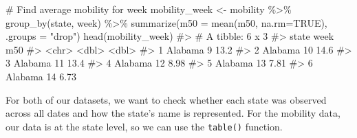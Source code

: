 \documentclass[
  letterpaper,
]{latex/krantz}
\makeatletter
\newenvironment{Shaded}{\begin{snugshade}}{\end{snugshade}}
\newcommand{\AttributeTok}[1]{\textcolor[rgb]{0.40,0.45,0.13}{#1}}
\newcommand{\CommentTok}[1]{\textcolor[rgb]{0.37,0.37,0.37}{#1}}
\newcommand{\ConstantTok}[1]{\textcolor[rgb]{0.56,0.35,0.01}{#1}}
\newcommand{\FunctionTok}[1]{\textcolor[rgb]{0.28,0.35,0.67}{#1}}
\newcommand{\NormalTok}[1]{\textcolor[rgb]{0.00,0.23,0.31}{#1}}
\newcommand{\OtherTok}[1]{\textcolor[rgb]{0.00,0.23,0.31}{#1}}
\newcommand{\SpecialCharTok}[1]{\textcolor[rgb]{0.37,0.37,0.37}{#1}}
\newcommand{\StringTok}[1]{\textcolor[rgb]{0.13,0.47,0.30}{#1}}
\newenvironment{kframe}{%
\medskip{}
\setlength{\fboxsep}{.8em}
 \def\at@end@of@kframe{}%
 \ifinner\ifhmode%
  \def\at@end@of@kframe{\end{minipage}}%
  \begin{minipage}{\columnwidth}%
 \fi\fi%
 \def\FrameCommand##1{\hskip\@totalleftmargin \hskip-\fboxsep
 \colorbox{shadecolor}{##1}\hskip-\fboxsep
     \hskip-\linewidth \hskip-\@totalleftmargin \hskip\columnwidth}%
 \MakeFramed {\advance\hsize-\width
   \@totalleftmargin\z@ \linewidth\hsize
   \@setminipage}}%
 {\par\unskip\endMakeFramed%
 \at@end@of@kframe}
\renewenvironment{Shaded}{\begin{kframe}}{\end{kframe}}
\makeatother
\begin{document}
\begin{Shaded}
\begin{Highlighting}[]
\CommentTok{\# Find average mobility for week}
\NormalTok{mobility\_week }\OtherTok{\textless{}{-}}\NormalTok{ mobility }\SpecialCharTok{\%\textgreater{}\%}
  \FunctionTok{group\_by}\NormalTok{(state, week) }\SpecialCharTok{\%\textgreater{}\%}
  \FunctionTok{summarize}\NormalTok{(}\AttributeTok{m50 =} \FunctionTok{mean}\NormalTok{(m50, }\AttributeTok{na.rm=}\ConstantTok{TRUE}\NormalTok{), }\AttributeTok{.groups =} \StringTok{"drop"}\NormalTok{) }
\FunctionTok{head}\NormalTok{(mobility\_week)}
\CommentTok{\#\textgreater{} \# A tibble: 6 x 3}
\CommentTok{\#\textgreater{}   state    week   m50}
\CommentTok{\#\textgreater{}   \textless{}chr\textgreater{}   \textless{}dbl\textgreater{} \textless{}dbl\textgreater{}}
\CommentTok{\#\textgreater{} 1 Alabama     9 13.2 }
\CommentTok{\#\textgreater{} 2 Alabama    10 14.6 }
\CommentTok{\#\textgreater{} 3 Alabama    11 13.4 }
\CommentTok{\#\textgreater{} 4 Alabama    12  8.98}
\CommentTok{\#\textgreater{} 5 Alabama    13  7.81}
\CommentTok{\#\textgreater{} 6 Alabama    14  6.73}
\end{Highlighting}
\end{Shaded}

For both of our datasets, we want to check whether each state was
observed across all dates and how the state's name is represented. For
the mobility data, our data is at the state level, so we can use the
\texttt{table()} function.
\end{document}
